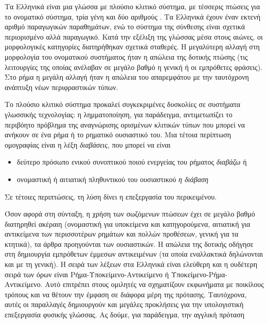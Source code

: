 \documentclass[]{../../metanetpaper}
\begin{document}
\begin{multicols}{2}
Τα Ελληνικά είναι μια γλώσσα με πλούσιο κλιτικό σύστημα, με τέσσερις πτώσεις για το ονοματικό σύστημα, τρία γένη και δύο αριθμούς \cite{Mack1}. Τα Ελληνικά έχουν έναν εκτενή  αριθμό  παραγωγικών παραθημάτων, ενώ το σύστημα της σύνθεσης είναι σχετικά περιορισμένο αλλά παραγωγικό. Κατά την εξέλιξη της γλώσσας μέσα στους αιώνες, οι μορφολογικές κατηγορίες διατηρήθηκαν σχετικά σταθερές. Η μεγαλύτερη αλλαγή στη μορφολογία του ονοματικού συστήματος ήταν η απώλεια της δοτικής πτώσης (τις λειτουργίες της οποίας ανέλαβαν σε μεγάλο βαθμό η γενική ή οι εμπρόθετες φράσεις). Στο ρήμα η μεγάλη αλλαγή ήταν η απώλεια του απαρεμφάτου με την ταυτόχρονη ανάπτυξη νέων περιφραστικών τύπων.


Το πλούσιο κλιτικό σύστημα προκαλεί συγκεκριμένες δυσκολίες σε συστήματα γλωσσικής τεχνολογίας: η λημματοποίηση, για παράδειγμα, αντιμετωπίζει το περιβόητο πρόβλημα της αναγνώρισης ορισμένων κλιτικών τύπων που μπορεί να ανήκουν σε ένα ρήμα ή το ρηματικό ουσιαστικό του. Μια τέτοια περίπτωση ομογραφίας είναι η λέξη \textit{διαβάσεις}, που μπορεί να είναι

\begin{itemize}
\item δεύτερο πρόσωπο ενικού συνοπτικού ποιού ενεργείας του ρήματος \textit{διαβάζω} ή
\item ονομαστική ή αιτιατική πληθυντικού του ουσιαστικού \textit{η διάβαση}
\end{itemize}

Σε τέτοιες περιπτώσεις, τη λύση δίνει η επεξεργασία του περικειμένου.

Όσον αφορά στη σύνταξη, η χρήση των σωζόμενων πτώσεων έχει σε μεγάλο βαθμό διατηρηθεί ακέραιη (ονομαστική για υποκείμενα και κατηγορούμενα, αιτιατική για αντικείμενα των περισσοτέρων ρημάτων και πολλών προθέσεων, γενική για τα κτητικά), τα άρθρα προηγούνται των ουσιαστικών. Η απώλεια της δοτικής οδήγησε στη δημιουργία εμπρόθετων έμμεσων αντικειμένων (τα οποία εναλλακτικά  δηλώνονται και με τη γενική). Η σειρά των λέξεων στα Ελληνικά είναι ελεύθερη και η ουδέτερη σειρά των όρων είναι Ρήμα-Υποκείμενο-Αντικείμενο ή Υποκείμενο-Ρήμα-Αντικείμενο. Αυτό επιτρέπει στους ομιλητές να σχηματίζουν εκφωνήματα με ποικίλους τρόπους και να θέτουν την έμφαση σε διάφορα μέρη της πρότασης. Ταυτόχρονα, αυτές οι παραλλαγές δημιουργούν και μεγάλες προκλήσεις για την υπολογιστική επεξεργασία φυσικής γλώσσας. Ας δούμε, για παράδειγμα, την αγγλική πρόταση


\end{multicols}
\end{document}
